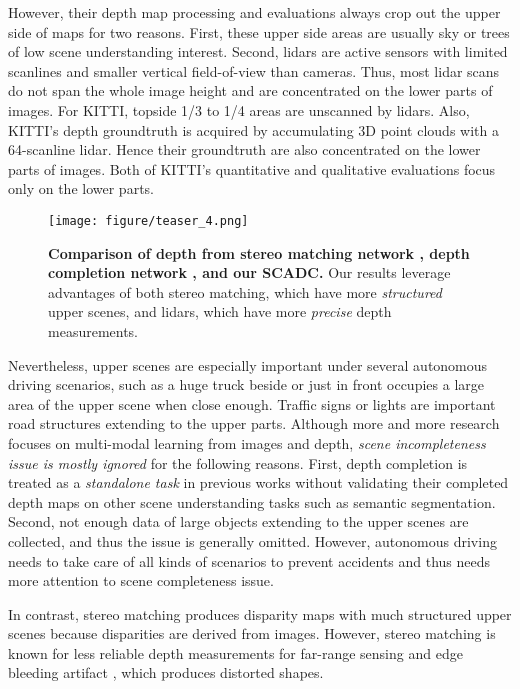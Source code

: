 \documentclass{article}
\begin{document}
However, their depth map processing and evaluations always crop out the upper side of maps for two reasons. First, these upper side areas are usually sky or trees of low scene understanding interest. Second, lidars are active sensors with limited scanlines and smaller vertical field-of-view than cameras. Thus, most lidar scans do not span the whole image height and are concentrated on the lower parts of images. For KITTI, topside 1/3 to 1/4 areas are unscanned by lidars. Also, KITTI's depth groundtruth is acquired by accumulating 3D point clouds with a 64-scanline lidar. Hence their groundtruth are also concentrated on the lower parts of images. Both of KITTI's quantitative and qualitative evaluations focus only on the lower parts.
\begin{figure}[bt!]
    \centering
    \texttt{[image: figure/teaser\_4.png]}
    \vspace{-20pt}
    \caption{\textbf{Comparison of depth from stereo matching network \cite{chang2018pyramid}, depth completion network \cite{ma2019self}, and our SCADC.} Our results leverage advantages of both stereo matching, which have more \textit{structured} upper scenes, and lidars, which have more \textit{precise} depth measurements.}
    \label{teaser}
    \vspace{-15pt}
\end{figure}

Nevertheless, upper scenes are especially important under several autonomous driving scenarios, such as a huge truck beside or just in front occupies a large area of the upper scene when close enough. Traffic signs or lights are important road structures extending to the upper parts. Although more and more research focuses on multi-modal learning from images and depth, \textit{scene incompleteness issue is mostly ignored} for the following reasons. First, depth completion is treated as a \textit{standalone task} in previous works without validating their completed depth maps on other scene understanding tasks such as semantic segmentation. Second, not enough data of large objects extending to the upper scenes are collected, and thus the issue is generally omitted. However, autonomous driving needs to take care of all kinds of scenarios to prevent accidents and thus needs more attention to scene completeness issue.

In contrast, stereo matching produces disparity maps with much structured upper scenes because disparities are derived from images. However, stereo matching is known for less reliable depth measurements for far-range sensing and edge bleeding artifact \cite{wang2014stereo}, which produces distorted shapes.
\end{document}
